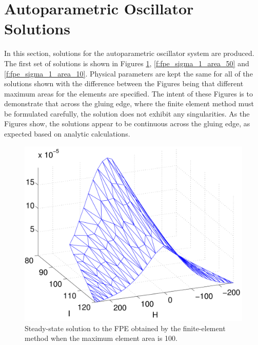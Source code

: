 \section{Autoparametric Oscillator Solutions}

In this section, solutions for the autoparametric oscillator system are produced. The first set of solutions is shown in Figures \ref{f:fpe_sigma_1_area_100}, \ref{f:fpe_sigma_1_area_50} and \ref{f:fpe_sigma_1_area_10}. Physical parameters are kept the same for all of the solutions shown with the difference between the Figures being that different maximum areas for the elements are specified. The intent of these Figures is to demonstrate that across the gluing edge, where the finite element method must be formulated carefully, the solution does not exhibit any singularities. As the Figures show, the solutions appear to be continuous across the gluing edge, as expected based on analytic calculations.

\begin{figure}
\begin{center}
\includegraphics[width=\textwidth]{figures/fpe_solution_sigma_1_area_100}
\caption{Steady-state solution to the FPE obtained by the finite-element method when the maximum element area is 100.}
\label{f:fpe_sigma_1_area_100}
\end{center}
\end{figure}

